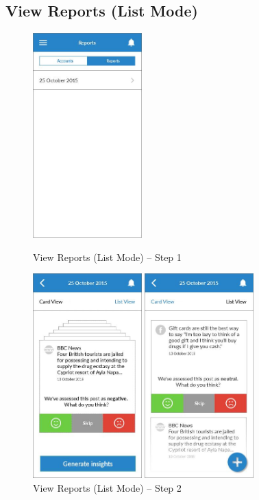 \clearpage

\subsection{View Reports (List Mode)}

\begin{figure}
  \subfigures
  \centering
  \begin{minipage}{4.6cm}
    \centering
    \includegraphics[width=4.2cm]{inc/ui_report_list_mode_step1.jpg}
    \caption{View Reports (List Mode) -- Step 1}
    \label{fig:ui_report_list_mode_step1}
  \end{minipage}
  \begin{minipage}{4.6cm}
    \centering
    \includegraphics[width=4.2cm]{inc/ui_report_list_mode_step2.jpg}
    \caption{View Reports (List Mode) -- Step 2}
    \label{fig:ui_report_list_mode_step2}
  \end{minipage}
  \begin{minipage}{4.6cm}
    \centering
    \includegraphics[width=4.2cm]{inc/ui_report_list_mode_step3.jpg}

\end{minipage}
\end{figure}
